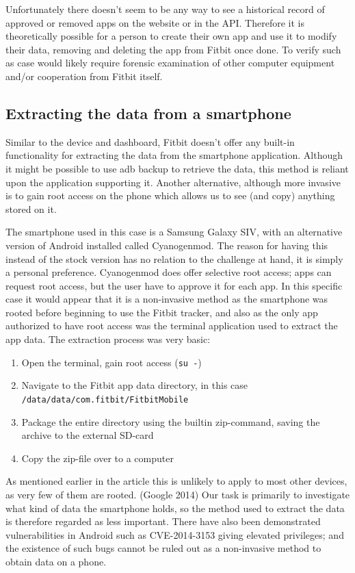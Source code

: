 \documentclass[a4paper,11pt,dvips]{article}
\begin{document}
Unfortunately there doesn't seem to be any way to see a historical record of approved or removed apps on the website or in the API. Therefore it is theoretically possible for a person to create their own app and use it to modify their data, removing and deleting the app from Fitbit once done. To verify such as case would likely require forensic examination of other computer equipment and/or cooperation from Fitbit itself.


\subsection{Extracting the data from a smartphone}

Similar to the device and dashboard, Fitbit doesn't offer any built-in functionality for extracting the data from the smartphone application. Although it might be possible to use adb backup to retrieve the data, this method is reliant upon the application supporting it. Another alternative, although more invasive is to gain root access on the phone which allows us to see (and copy) anything stored on it.

The smartphone used in this case is a Samsung Galaxy SIV, with an alternative version of Android installed called Cyanogenmod. The reason for having this instead of the stock version has no relation to the challenge at hand, it is simply a personal preference. Cyanogenmod does offer selective root access; apps can request root access, but the user have to approve it for each app. In this specific case it would appear that it is a non-invasive method as the smartphone was rooted before beginning to use the Fitbit tracker, and also as the only app authorized to have root access was the terminal application used to extract the app data. The extraction process was very basic:

\begin{enumerate}
\item Open the terminal, gain root access (\texttt{su -})
\item Navigate to the Fitbit app data directory, in this case \\ \texttt{/data/data/com.fitbit/FitbitMobile}
\item Package the entire directory using the builtin zip-command, saving the archive to the external SD-card
\item Copy the zip-file over to a computer
\end{enumerate}

As mentioned earlier in the article this is unlikely to apply to most other devices, as very few of them are rooted. (Google 2014) Our task is primarily to investigate what kind of data the smartphone holds, so the method used to extract the data is therefore regarded as less important. There have also been demonstrated vulnerabilities in Android such as CVE-2014-3153 giving elevated privileges; and the existence of such bugs cannot be ruled out as a non-invasive method to obtain data on a phone.
\end{document}
